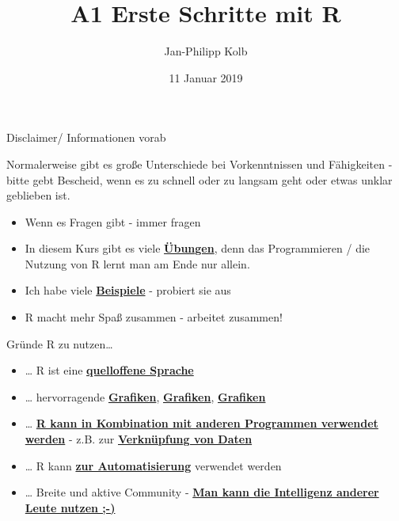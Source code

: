 \documentclass[ignorenonframetext,]{beamer}
\title{A1 Erste Schritte mit R}
\author{Jan-Philipp Kolb}
\date{11 Januar 2019}
\providecommand{\tightlist}{%
  \setlength{\itemsep}{0pt}\setlength{\parskip}{0pt}}
\begin{document}
\frame{\titlepage}

\begin{frame}{Disclaimer/ Informationen vorab}
\protect\hypertarget{disclaimer-informationen-vorab}{}

Normalerweise gibt es große Unterschiede bei Vorkenntnissen und
Fähigkeiten - bitte gebt Bescheid, wenn es zu schnell oder zu langsam
geht oder etwas unklar geblieben ist.

\begin{itemize}
\tightlist
\item
  Wenn es Fragen gibt - immer fragen
\item
  In diesem Kurs gibt es viele
  \href{http://web.math.ku.dk/~helle/R-intro/exercises.pdf}{\textbf{Übungen}},
  denn das Programmieren / die Nutzung von R lernt man am Ende nur
  allein.
\item
  Ich habe viele \href{https://www.showmeshiny.com/}{\textbf{Beispiele}}
  - probiert sie aus
\item
  R macht mehr Spaß zusammen - arbeitet zusammen!
\end{itemize}

\end{frame}

\begin{frame}{Gründe R zu nutzen\ldots{}}
\protect\hypertarget{grunde-r-zu-nutzen}{}

\begin{itemize}
\item
  \ldots{} R ist eine
  \href{https://stackoverflow.com/questions/1546583/what-is-the-definition-of-an-open-source-programming-language}{\textbf{quelloffene
  Sprache}}
\item
  \ldots{} hervorragende
  \href{http://matthewlincoln.net/2014/12/20/adjacency-matrix-plots-with-r-and-ggplot2.html}{\textbf{Grafiken}},
  \href{https://www.r-bloggers.com/3d-plots-with-ggplot2-and-plotly\%20/}{\textbf{Grafiken}},
  \href{https://procomun.wordpress.com/2011/03/18/splomr/}{\textbf{Grafiken}}
\item
  \ldots{} \href{https://github.com/Japhilko/RInterfaces}{\textbf{R kann
  in Kombination mit anderen Programmen verwendet werden}} - z.B. zur
  \href{https://github.com/Japhilko/RInterfaces/blob/master/slides/Datenimport.md}{\textbf{Verknüpfung
  von Daten}}
\item
  \ldots{} R kann
  \href{https://cran.r-project.org/web/packages/MplusAutomation/index.html}{\textbf{zur
  Automatisierung}} verwendet werden
\item
  \ldots{} Breite und aktive Community -
  \href{https://www.r-bloggers.com/}{\textbf{Man kann die Intelligenz
  anderer Leute nutzen ;-)}}
\end{itemize}

\end{frame}
\end{document}
